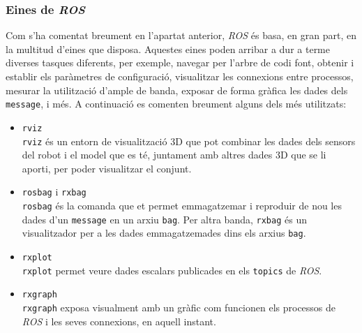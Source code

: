 \documentclass[12pt,a4paper,final,twoside]{report}
\begin{document}
\subsubsection{Eines de \textit{ROS}}

Com s'ha comentat breument en l'apartat anterior, \textit{ROS} és basa, en gran part, en la multitud d'eines que disposa. Aquestes eines poden arribar a dur a terme diverses tasques diferents, per exemple, navegar per l'arbre de codi font, obtenir i establir els paràmetres de configuració, visualitzar les connexions entre processos, mesurar la utilització d'ample de banda, exposar de forma gràfica les dades dels \texttt{message}, i més. A continuació es comenten breument alguns dels més utilitzats:
\begin{itemize}
\item \texttt{rviz}\\
\texttt{rviz} és un entorn de visualització 3D que pot combinar les dades dels sensors del robot i el model que es té, juntament amb altres dades 3D que se li aporti, per poder visualitzar el conjunt.

\item \texttt{rosbag} i \texttt{rxbag}\\
\texttt{rosbag} és la comanda que et permet emmagatzemar i reproduir de nou les dades d'un \texttt{message} en un arxiu \texttt{bag}. Per altra banda, \texttt{rxbag} és un visualitzador per a les dades emmagatzemades dins els arxius \texttt{bag}.

\item \texttt{rxplot}\\
\texttt{rxplot} permet veure dades escalars publicades en els \texttt{topics} de \textit{ROS}.

\item \texttt{rxgraph}\\
\texttt{rxgraph} exposa visualment amb un gràfic com funcionen els processos de \textit{ROS} i les seves connexions, en aquell instant.

\end{itemize}

\end{document}
